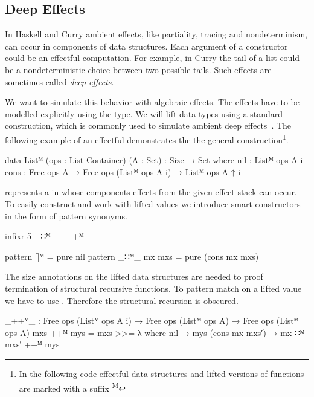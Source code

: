 \subsection{Deep Effects}

In Haskell and Curry ambient effects, like partiality, tracing and
nondeterminism, can occur in components of data structures.
Each argument of a constructor could be an effectful computation.
For example, in Curry the tail of a list could be a nondeterministic choice
between two possible tails.
Such effects are sometimes called \textit{deep effects}.

We want to simulate this behavior with algebraic effects.
The effects have to be modelled explicitly using the  type.
We will lift data types using a standard construction, which is commonly used
to simulate ambient deep
effects~\cite{DBLP:conf/haskell/AbelBBHN05, DBLP:journals/programming/DylusCT19,
DBLP:conf/haskell/ChristiansenDB19}.
The following example of an effectful  demonstrates the
the general construction\footnote{In the following code effectful data
  structures and lifted versions of functions are marked with a suffix
  \textsuperscript{M}}.

\begin{code}
data Listᴹ (ops : List Container) (A : Set) : {Size} → Set where
  nil   : Listᴹ ops A {i}
  cons  : Free ops A → Free ops (Listᴹ ops A {i}) → Listᴹ ops A {↑ i}
\end{code}
\AgdaSpace{}\AgdaSpace{}
represents a \AgdaSpace{} in whose components
effects from the given effect stack  can occur.
To easily construct and work with lifted values we introduce smart constructors
in the form of pattern synonyms.

\begin{code}[hide]
infixr 5 _∷ᴹ_ _++ᴹ_
\end{code}
\begin{code}
pattern []ᴹ          = pure nil
pattern _∷ᴹ_ mx mxs  = pure (cons mx mxs)
\end{code}
The size annotations on the lifted data structures are needed to proof
termination of structural recursive functions.
To pattern match on a lifted value we have to use \AgdaFunction{>>=}.
Therefore the structural recursion is obscured.

\begin{code}
_++ᴹ_ : Free ops (Listᴹ ops A {i}) → Free ops (Listᴹ ops A) → Free ops (Listᴹ ops A)
mxs ++ᴹ mys = mxs >>= λ where
  nil             → mys
  (cons mx mxs′)  → mx ∷ᴹ mxs′ ++ᴹ mys
\end{code}

